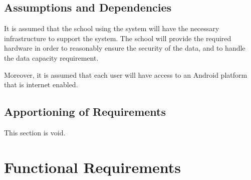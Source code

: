 \documentclass[]{article}
\begin{document}
\subsection{Assumptions and Dependencies}
\label{sub:assumptions_and_dependencies}
It is assumed that the school using the system will have the necessary infrastructure to support the system. The school will provide the required hardware in order to reasonably ensure the security of the data, and to handle the data capacity requirement.

Moreover, it is assumed that each user will have access to an Android platform that is internet enabled.

\subsection{Apportioning of Requirements}
\label{sub:apportioning_of_requirements}
This section is void.


\section{Functional Requirements}
\label{sec:functional_requirements}


\end{document}
